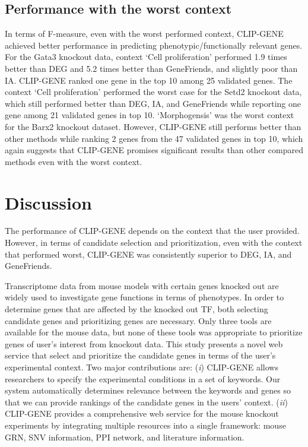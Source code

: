 \documentclass[oneside,phd]{snuthesis}
\begin{document}
\subsection{Performance with the worst context}

In terms of F-measure, even with the worst performed context, CLIP-GENE achieved better performance in predicting phenotypic/functionally relevant genes. 
For the Gata3 knockout data, context ‘Cell proliferation’ performed 1.9 times better than DEG and 5.2 times better than GeneFriends, and slightly poor than IA. 
CLIP-GENE ranked one gene in the top 10 among 25 validated genes.
The context ‘Cell proliferation’ performed the worst case for the Setd2 knockout data, which still performed better than DEG, IA, and GeneFriends while reporting one
gene among 21 validated genes in top 10. ‘Morphogensis’ was the worst context for the Barx2 knockout dataset.
However, CLIP-GENE still performs better than other methods while ranking 2 genes from the 47 validated genes in top 10, which again suggests that CLIP-GENE promises significant results than other compared methods even with the worst context.

\section{Discussion}

The performance of CLIP-GENE depends on the context that the user provided. 
However, in terms of candidate selection and prioritization, even with the context that performed worst, CLIP-GENE was consistently superior to DEG, IA, and GeneFriends.

Transcriptome data from mouse models with certain genes knocked out are widely used to investigate gene functions in terms of phenotypes. 
In order to determine genes that are affected by the knocked out TF, both selecting
candidate genes and prioritizing genes are necessary.
Only three tools are available for the mouse data, but none of these tools was appropriate to prioritize genes of user’s interest from knockout data. 
This study presents a novel web service that select and prioritize the candidate
genes in terms of the user’s experimental context. 
Two major contributions are: (\textit{i}) CLIP-GENE allows researchers to specify the
experimental conditions in a set of keywords. 
Our system automatically determines relevance between the keywords and genes so that we can provide rankings of the candidate genes in the users' context.
(\textit{ii}) CLIP-GENE provides a comprehensive web service for the mouse knockout experiments by integrating multiple resources into a single framework: mouse GRN, SNV information, PPI network, and literature information.
\end{document}
